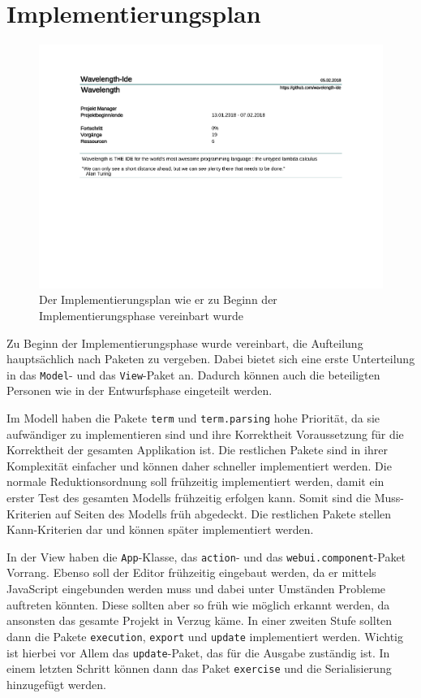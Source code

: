 \documentclass[parskip=full,11pt]{scrartcl}
\begin{document}
\section{Implementierungsplan}
\begin{figure}[h]
\hspace*{-2cm}
\includegraphics[trim={0, 9.5cm, 0, 0}, clip, scale=0.65, page=4]{Implementierungsplan/Implementierungsplan-vorher.pdf}
\caption{Der Implementierungsplan wie er zu Beginn der Implementierungsphase vereinbart wurde}
\end{figure}

Zu Beginn der Implementierungsphase wurde vereinbart, die Aufteilung hauptsächlich nach Paketen zu vergeben.
Dabei bietet sich eine erste Unterteilung in das \texttt{Model}- und das \texttt{View}-Paket an.
Dadurch können auch die beteiligten Personen wie in der Entwurfsphase eingeteilt werden.

Im Modell haben die Pakete \texttt{term} und \texttt{term.parsing} hohe Priorität, da sie aufwändiger zu implementieren
sind und ihre Korrektheit Voraussetzung für die Korrektheit der gesamten Applikation ist.
Die restlichen Pakete sind in ihrer Komplexität einfacher und können daher schneller implementiert werden.
Die normale Reduktionsordnung soll frühzeitig implementiert werden, damit ein erster Test des gesamten Modells frühzeitig erfolgen kann.
Somit sind die Muss-Kriterien auf Seiten des Modells früh abgedeckt.
Die restlichen Pakete stellen Kann-Kriterien dar und können später implementiert werden.

In der View haben die \texttt{App}-Klasse, das \texttt{action}- und das \texttt{webui.component}-Paket Vorrang.
Ebenso soll der Editor frühzeitig eingebaut werden, da er mittels JavaScript eingebunden werden muss und dabei unter Umständen Probleme
auftreten könnten.
Diese sollten aber so früh wie möglich erkannt werden, da ansonsten das gesamte Projekt in Verzug käme.
In einer zweiten Stufe sollten dann die Pakete \texttt{execution}, \texttt{export} und \texttt{update} implementiert werden.
Wichtig ist hierbei vor Allem das \texttt{update}-Paket, das für die Ausgabe zuständig ist.
In einem letzten Schritt können dann das Paket \texttt{exercise} und die Serialisierung hinzugefügt werden.
\end{document}
